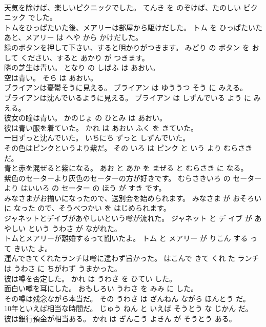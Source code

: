 \documentclass[8pt]{extreport}
\begin{document}
\begin{CJK}{UTF8}{min}
\\	天気を除けば、楽しいピクニックでした。	てんき を のぞけば、たのしい ピクニック でした。	
\\	トムをひっぱたいた後、メアリーは部屋から駆けだした。	トム を ひっぱたいた あと、メアリー は へや から かけだした。	
\\	緑のボタンを押して下さい、すると明かりがつきます。	みどり の ボタン を おして ください、すると あかり が つきます。	
\\	隣の芝生は青い。	となり の しばふ は あおい。	
\\	空は青い。	そら は あおい。	
\\	ブライアンは憂鬱そうに見える。	ブライアン は ゆううつ そう に みえる。	
\\	ブライアンは沈んでいるように見える。	ブライアン は しずんでいる よう に みえる。	
\\	彼女の瞳は青い。	かのじょ の ひとみ は あおい。	
\\	彼は青い服を着ていた。	かれ は あおい ふく を きていた。	
\\	一日ずっと沈んでいた。	いちにち ずっと しずんでいた。	
\\	その色はピンクというより紫だ。	その いろ は ピンク と いう より むらさき だ。	
\\	青と赤を混ぜると紫になる。	あお と あか を まぜる と むらさき に なる。	
\\	紫色のセーターより灰色のセーターの方が好きです。	むらさきいろ の セーター より はいいろ の セーター の ほう が すき です。	
\\	みなさまがお揃いになったので、送別会を始められます。	みなさま が おそろい に なった ので、そうべつかい を はじめられます。	
\\	ジャネットとデイブがあやしいという噂が流れた。	ジャネット と デ イブ が あやしい という うわさ が ながれた。	
\\	トムとメアリーが離婚するって聞いたよ。	トム と メアリー が りこん する って きいた よ。	
\\	運んできてくれたランチは噂に違わず旨かった。	はこんで きて くれ た ランチ は うわさ に ちがわず うまかった。	
\\	彼は噂を否定した。	かれ は うわさ を ひてい した。	
\\	面白い噂を耳にした。	おもしろい うわさ を みみ に した。	
\\	その噂は残念ながら本当だ。	その うわさ は ざんねん ながら ほんとう だ。	
\\	10年といえば相当な時間だ。	じゅう ねん と いえば そうとう な じかん だ。	
\\	彼は銀行預金が相当ある。	かれ は ぎんこう よきん が そうとう ある。	

\end{CJK}
\end{document}
